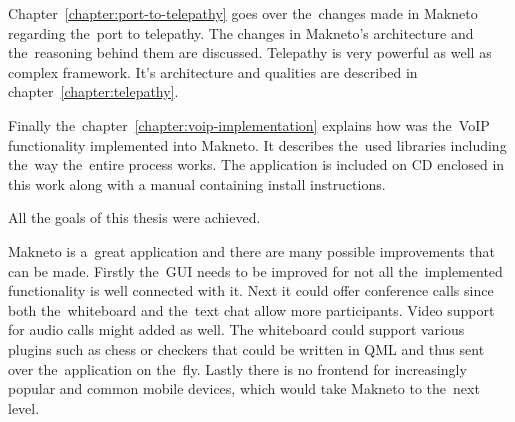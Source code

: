 Chapter~\ref{chapter:port-to-telepathy} goes over the~changes made in Makneto regarding the~port to telepathy. The changes in Makneto's architecture and the~reasoning behind them are discussed. Telepathy is very powerful as well as complex framework. It's architecture and qualities are described in chapter~\ref{chapter:telepathy}. 

Finally the~chapter~\ref{chapter:voip-implementation} explains how was the~VoIP functionality implemented into Makneto. It describes the~used libraries 
including the~way the~entire process works. The application is included on CD enclosed in this work along with a manual containing install instructions.

All the goals of this thesis were achieved.

Makneto is a~great application and there are many possible improvements that can be made. Firstly the~GUI needs to be improved for not all the~implemented functionality is well connected with it. Next it could offer conference calls since both the~whiteboard and the~text chat allow more participants. Video support for audio calls might added as well. The whiteboard could support various plugins such as chess or checkers that could be written in QML and thus sent over the~application on the~fly. Lastly there is no frontend for increasingly popular and common mobile devices, which would take Makneto to the~next level.
